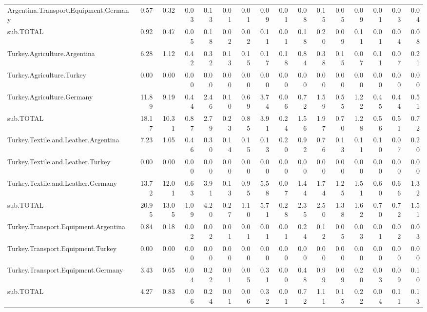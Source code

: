 \documentclass[a4paper]{article}\usepackage[]{graphicx}\usepackage[]{color}
\begin{document}
\begin{sidewaystable}[htbp]
\begin{tabular}{lrrrrrrrrrrrrrrr}
    Argentina.Transport.Equipment.Germany & 0.57  & 0.32  & 0.03  & 0.13  & 0.01  & 0.01  & 0.09  & 0.01  & 0.08  & 0.15  & 0.05  & 0.09  & 0.01  & 0.03  & 0.04 \\
    sub.TOTAL & 0.92  & 0.47  & 0.05  & 0.18  & 0.02  & 0.02  & 0.11  & 0.01  & 0.18  & 0.20  & 0.09  & 0.11  & 0.01  & 0.04  & 0.08 \\
    Turkey.Agriculture.Argentina & 6.28  & 1.12  & 0.42  & 0.32  & 0.13  & 0.15  & 0.17  & 0.18  & 0.84  & 0.38  & 0.15  & 0.07  & 0.11  & 0.07  & 0.21 \\
    Turkey.Agriculture.Turkey & 0.00  & 0.00  & 0.00  & 0.00  & 0.00  & 0.00  & 0.00  & 0.00  & 0.00  & 0.00  & 0.00  & 0.00  & 0.00  & 0.00  & 0.00 \\
    Turkey.Agriculture.Germany & 11.89 & 9.19  & 0.44  & 2.46  & 0.10  & 0.69  & 3.74  & 0.06  & 0.72  & 1.59  & 0.55  & 1.22  & 0.45  & 0.44  & 0.51 \\
    sub.TOTAL & 18.17 & 10.31 & 0.87  & 2.79  & 0.23  & 0.85  & 3.91  & 0.24  & 1.56  & 1.97  & 0.70  & 1.28  & 0.56  & 0.51  & 0.72 \\
    Turkey.Textile.and.Leather.Argentina & 7.23  & 1.05  & 0.46  & 0.30  & 0.14  & 0.15  & 0.13  & 0.20  & 0.92  & 0.76  & 0.13  & 0.11  & 0.10  & 0.07  & 0.20 \\
    Turkey.Textile.and.Leather.Turkey & 0.00  & 0.00  & 0.00  & 0.00  & 0.00  & 0.00  & 0.00  & 0.00  & 0.00  & 0.00  & 0.00  & 0.00  & 0.00  & 0.00  & 0.00 \\
    Turkey.Textile.and.Leather.Germany & 13.72 & 12.01 & 0.63  & 3.91  & 0.13  & 0.95  & 5.58  & 0.07  & 1.44  & 1.74  & 1.25  & 1.51  & 0.60  & 0.66  & 1.32 \\
    sub.TOTAL & 20.95 & 13.05 & 1.09  & 4.20  & 0.27  & 1.10  & 5.71  & 0.28  & 2.35  & 2.50  & 1.38  & 1.62  & 0.70  & 0.72  & 1.51 \\
    Turkey.Transport.Equipment.Argentina & 0.84  & 0.18  & 0.02  & 0.02  & 0.01  & 0.01  & 0.01  & 0.01  & 0.24  & 0.12  & 0.05  & 0.03  & 0.01  & 0.02  & 0.03 \\
    Turkey.Transport.Equipment.Turkey & 0.00  & 0.00  & 0.00  & 0.00  & 0.00  & 0.00  & 0.00  & 0.00  & 0.00  & 0.00  & 0.00  & 0.00  & 0.00  & 0.00  & 0.00 \\
    Turkey.Transport.Equipment.Germany & 3.43  & 0.65  & 0.04  & 0.22  & 0.01  & 0.05  & 0.31  & 0.00  & 0.48  & 0.99  & 0.09  & 0.20  & 0.03  & 0.09  & 0.10 \\
    sub.TOTAL & 4.27  & 0.83  & 0.06  & 0.24  & 0.01  & 0.06  & 0.32  & 0.01  & 0.72  & 1.11  & 0.15  & 0.22  & 0.04  & 0.11  & 0.13 \\

\end{tabular}
\end{sidewaystable}
\end{document}
